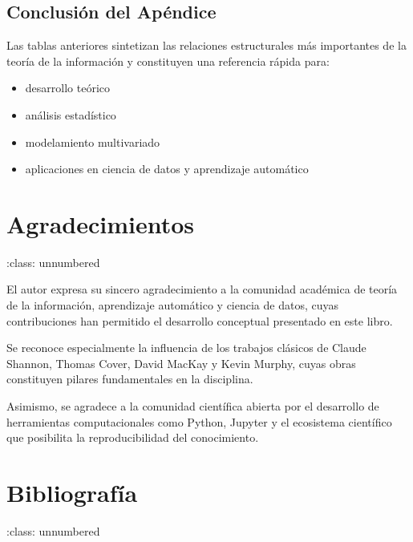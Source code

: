 \documentclass[letterpaper,10pt,english]{jupyterBook}
\begin{document}
\section{Conclusión del Apéndice}
\label{\detokenize{05_appendices/advanced_tables:conclusion-del-apendice}}
\sphinxAtStartPar
Las tablas anteriores sintetizan las relaciones estructurales más importantes
de la teoría de la información y constituyen una referencia rápida para:
\begin{itemize}
\item {} 
\sphinxAtStartPar
desarrollo teórico

\item {} 
\sphinxAtStartPar
análisis estadístico

\item {} 
\sphinxAtStartPar
modelamiento multivariado

\item {} 
\sphinxAtStartPar
aplicaciones en ciencia de datos y aprendizaje automático

\end{itemize}

\sphinxstepscope


\chapter{Agradecimientos}
\label{\detokenize{05_appendices/acknowledgments:agradecimientos}}\label{\detokenize{05_appendices/acknowledgments::doc}}
\sphinxAtStartPar
:class: unnumbered

\sphinxAtStartPar
El autor expresa su sincero agradecimiento a la comunidad académica
de teoría de la información, aprendizaje automático y ciencia de datos,
cuyas contribuciones han permitido el desarrollo conceptual presentado
en este libro.

\sphinxAtStartPar
Se reconoce especialmente la influencia de los trabajos clásicos de
Claude Shannon, Thomas Cover, David MacKay y Kevin Murphy,
cuyas obras constituyen pilares fundamentales en la disciplina.

\sphinxAtStartPar
Asimismo, se agradece a la comunidad científica abierta por el
desarrollo de herramientas computacionales como Python, Jupyter
y el ecosistema científico que posibilita la reproducibilidad
del conocimiento.

\sphinxstepscope


\chapter{Bibliografía}
\label{\detokenize{05_appendices/references:bibliografia}}\label{\detokenize{05_appendices/references::doc}}
\sphinxAtStartPar
:class: unnumbered
\end{document}
